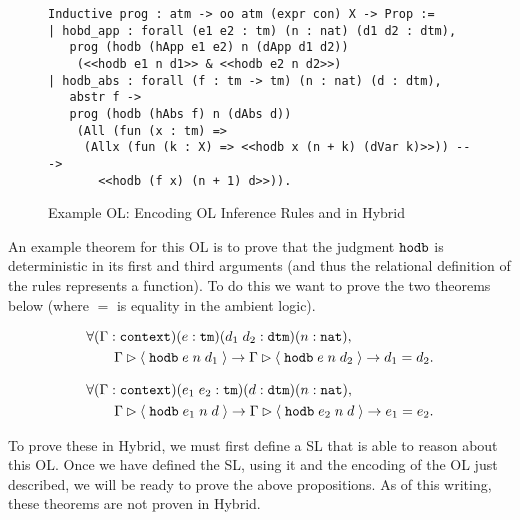 \begin{figure}
\begin{lstlisting}
Inductive prog : atm -> oo atm (expr con) X -> Prop :=
| hobd_app : forall (e1 e2 : tm) (n : nat) (d1 d2 : dtm),
   prog (hodb (hApp e1 e2) n (dApp d1 d2))
    (<<hodb e1 n d1>> & <<hodb e2 n d2>>)
| hodb_abs : forall (f : tm -> tm) (n : nat) (d : dtm),
   abstr f ->
   prog (hodb (hAbs f) n (dAbs d))
    (All (fun (x : tm) =>
     (Allx (fun (k : X) => <<hodb x (n + k) (dVar k)>>)) --->
       <<hodb (f x) (n + 1) d>>)).
\end{lstlisting}
\caption{Example OL: Encoding OL Inference Rules  and  in Hybrid \label{fig:hoasdb_prog}}
\end{figure}

An example theorem for this OL is to prove that the judgment $\texttt{hodb}$ is deterministic in its first and third arguments (and thus the relational definition of the rules represents a function). To do this we want to prove the two theorems below (where $=$ is equality in the ambient logic).

\begin{prop}
\label{thm:hodb_det1}
\begin{align*}
& \forall (\Gamma{} : \mathtt{context}) (e : \mathtt{tm}) (d_1 \; d_2 : \mathtt{dtm}) (n : \mathtt{nat}), \\
& \qquad \Gamma{} \rhd \langle \; \mathtt{hodb} \; e \; n \; d_1 \; \rangle \rightarrow \Gamma{} \rhd \langle \; \mathtt{hodb} \; e \; n \; d_2 \; \rangle \rightarrow d_1 = d_2.
\end{align*}
\end{prop}

\begin{prop}
\label{thm:hodb_det3}
\begin{align*}
& \forall (\Gamma{} : \mathtt{context}) (e_1 \; e_2 : \mathtt{tm}) (d : \mathtt{dtm}) (n : \mathtt{nat}), \\
& \qquad \Gamma{} \rhd \langle \; \mathtt{hodb} \; e_1 \; n \; d \; \rangle \rightarrow \Gamma{} \rhd \langle \; \mathtt{hodb} \; e_2 \; n \; d \; \rangle \rightarrow e_1 = e_2.
\end{align*}
\end{prop}

To prove these in Hybrid, we must first define a SL that is able to reason about this OL. Once we have defined the SL, using it and the encoding of the OL just described, we will be ready to prove the above propositions. As of this writing, these theorems are not proven in Hybrid.

